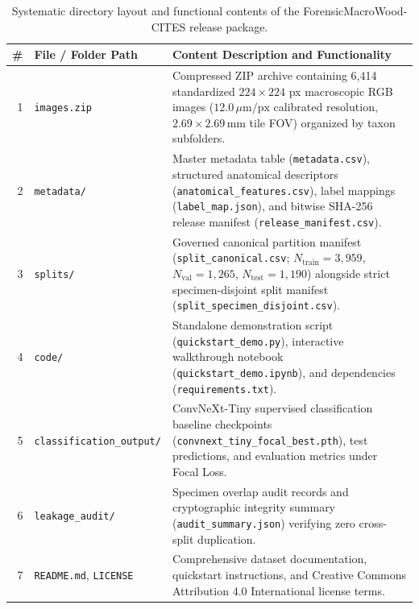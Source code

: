 \documentclass[a4paper,fleqn,12pt]{cas-sc}
\begin{document}
\begin{table}[pos=htbp]
\centering
\small
\setlength{\tabcolsep}{4pt}
\renewcommand{\arraystretch}{1.12}
\caption{Systematic directory layout and functional contents of the ForensicMacroWood-CITES release package.}
\label{tab:repo_contents}
\begin{tabularx}{\linewidth}{@{} r l X @{}}
\toprule
\textbf{\#} & \textbf{File / Folder Path} & \textbf{Content Description and Functionality} \\
\midrule
1 & \texttt{images.zip} & Compressed ZIP archive containing 6,414 standardized $224 \times 224$ px macroscopic RGB images ($12.0\,\mu\text{m/px}$ calibrated resolution, $2.69 \times 2.69\,\text{mm}$ tile FOV) organized by taxon subfolders. \\
2 & \texttt{metadata/} & Master metadata table (\texttt{metadata.csv}), structured anatomical descriptors (\texttt{anatomical\_features.csv}), label mappings (\texttt{label\_map.json}), and bitwise SHA-256 release manifest (\texttt{release\_manifest.csv}). \\
3 & \texttt{splits/} & Governed canonical partition manifest (\texttt{split\_canonical.csv}; $N_{\text{train}} = 3,959$, $N_{\text{val}} = 1,265$, $N_{\text{test}} = 1,190$) alongside strict specimen-disjoint split manifest (\texttt{split\_specimen\_disjoint.csv}). \\
4 & \texttt{code/} & Standalone demonstration script (\texttt{quickstart\_demo.py}), interactive walkthrough notebook (\texttt{quickstart\_demo.ipynb}), and dependencies (\texttt{requirements.txt}). \\
5 & \texttt{classification\_output/} & ConvNeXt-Tiny supervised classification baseline checkpoints (\texttt{convnext\_tiny\_focal\_best.pth}), test predictions, and evaluation metrics under Focal Loss. \\
6 & \texttt{leakage\_audit/} & Specimen overlap audit records and cryptographic integrity summary (\texttt{audit\_summary.json}) verifying zero cross-split duplication. \\
7 & \texttt{README.md}, \texttt{LICENSE} & Comprehensive dataset documentation, quickstart instructions, and Creative Commons Attribution 4.0 International license terms. \\
\bottomrule
\end{tabularx}
\end{table}
\end{document}
